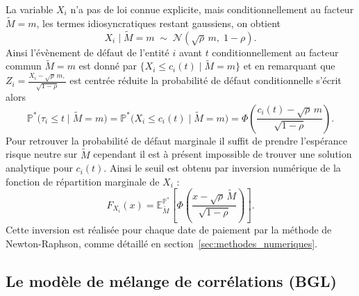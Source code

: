 La variable $X_i$ n'a pas de loi connue explicite, mais conditionnellement
au facteur $\tilde{M} = m$, les termes idiosyncratiques restant gaussiens, on obtient
\begin{equation}
    X_i \mid \tilde{M} = m \;\sim\; \mathcal{N}\!\left(\sqrt{\rho}\, m,\; 1-\rho\right).
\end{equation}
Ainsi l'évènement de défaut de l'entité $i$ avant $t$ conditionnellement au facteur commun $\tilde{M} = m$
est donné par $\{ X_i \leq c_i(t) \mid \tilde{M} = m\}$ et en remarquant que 
$Z_i = \frac{X_i - \sqrt{\rho}\, m,}{\sqrt{1-\rho}}$ est centrée réduite la probabilité de défaut conditionnelle
s'écrit alors
\begin{equation}
    \mathbb{P}^\ast\bigl(\tau_i \leq t \mid \tilde{M} = m\bigr)
    =\mathbb{P}^\ast\bigl(X_i \leq c_i(t) \mid \tilde{M} = m\bigr)
    = \Phi\!\left(\frac{c_i(t) - \sqrt{\rho}\, m}{\sqrt{1-\rho}}\right) .
\end{equation}
Pour retrouver la probabilité de défaut marginale il suffit de prendre l'espérance risque neutre sur $\tilde{M}$
cependant il est à présent impossible de trouver une solution analytique pour $c_i(t)$. Ainsi le seuil est 
obtenu par inversion numérique de la fonction de répartition marginale de $X_i$ : 
\begin{equation}
    F_{X_i}(x) = \mathbb{E}^{\mathbb{P}^\ast}_{\tilde{M}}\left[\Phi\left(\frac{x - \sqrt{\rho}\,\tilde{M}}{\sqrt{1-\rho}}\right)\right] .
\end{equation}
Cette inversion est réalisée pour chaque date de paiement par la méthode de Newton-Raphson,
comme détaillé en section~\ref{sec:methodes_numeriques}.

\subsection{Le modèle de mélange de corrélations (BGL)}

